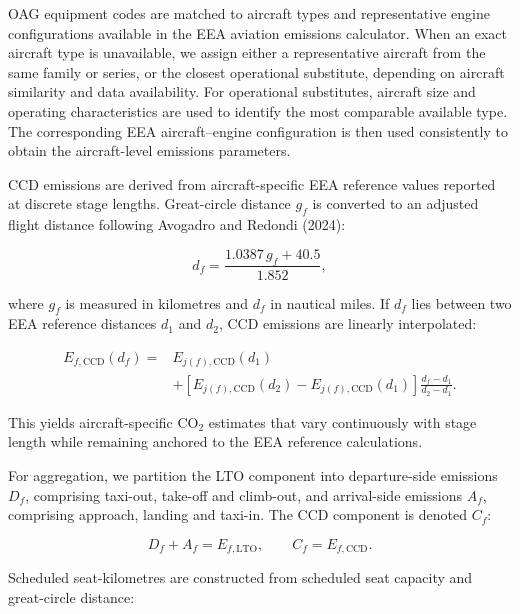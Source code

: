 \documentclass[12pt]{article}
\begin{document}
OAG equipment codes are matched to aircraft types and representative engine configurations available in the EEA aviation emissions calculator. When an exact aircraft type is unavailable, we assign either a representative aircraft from the same family or series, or the closest operational substitute, depending on aircraft similarity and data availability. For operational substitutes, aircraft size and operating characteristics are used to identify the most comparable available type. The corresponding EEA aircraft--engine configuration is then used consistently to obtain the aircraft-level emissions parameters.

CCD emissions are derived from aircraft-specific EEA reference values reported at discrete stage lengths. Great-circle distance $g_f$ is converted to an adjusted flight distance following Avogadro and Redondi (2024):

\begin{equation}
d_f
=
\frac{1.0387\,g_f+40.5}{1.852},
\label{eq:nature_3}
\end{equation}

where $g_f$ is measured in kilometres and $d_f$ in nautical miles. If $d_f$ lies between two EEA reference distances $d_1$ and $d_2$, CCD emissions are linearly interpolated:

\begin{equation}
\begin{split}
E_{f,\mathrm{CCD}}(d_f)
={}&E_{j(f),\mathrm{CCD}}(d_1)\\
&+\left[E_{j(f),\mathrm{CCD}}(d_2)-E_{j(f),\mathrm{CCD}}(d_1)\right]
\frac{d_f-d_1}{d_2-d_1}.
\end{split}
\label{eq:nature_4}
\end{equation}

This yields aircraft-specific CO$_2$ estimates that vary continuously with stage length while remaining anchored to the EEA reference calculations.

For aggregation, we partition the LTO component into departure-side emissions $D_f$, comprising taxi-out, take-off and climb-out, and arrival-side emissions $A_f$, comprising approach, landing and taxi-in. The CCD component is denoted $C_f$:

\begin{equation}
D_f+A_f=E_{f,\mathrm{LTO}},
\qquad
C_f=E_{f,\mathrm{CCD}}.
\label{eq:nature_5}
\end{equation}

Scheduled seat-kilometres are constructed from scheduled seat capacity and great-circle distance:
\end{document}
